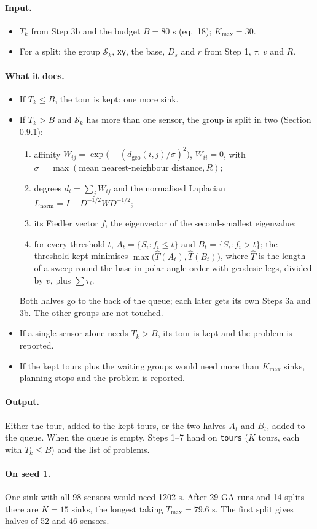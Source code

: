 \documentclass[10pt]{article}
\newcommand{\code}[1]{\texttt{#1}}
\newcommand{\dgeo}{d_{\mathrm{geo}}}
\newcommand{\Kmax}{K_{\max}}
\newcommand{\inputs}{\paragraph{Input.}}
\newcommand{\does}{\paragraph{What it does.}}
\newcommand{\outputs}{\paragraph{Output.}}
\newcommand{\seedone}{\paragraph{On seed 1.}}
\begin{document}
\inputs
\begin{itemize}
  \item $T_k$ from Step 3b and the budget $B = 80$ s (eq.~18); $\Kmax = 30$.
  \item For a split: the group $\mathcal{S}_k$, \code{xy}, the base, $D_s$ and $r$ from Step 1, $\tau$, $v$ and $R$.
\end{itemize}
\does
\begin{itemize}
  \item If $T_k \le B$, the tour is kept: one more sink.
  \item If $T_k > B$ and $\mathcal{S}_k$ has more than one sensor, the group is split in two (Section 0.9.1):
    \begin{enumerate}
      \item affinity $W_{ij} = \exp\!\big(-(\dgeo(i,j)/\sigma)^2\big)$, $W_{ii} = 0$, with
        $\sigma = \max(\text{mean nearest-neighbour distance}, R)$;
      \item degrees $d_i = \sum_j W_{ij}$ and the normalised Laplacian $L_{\mathrm{norm}} = I - D^{-1/2} W D^{-1/2}$;
      \item its Fiedler vector $f$, the eigenvector of the second-smallest eigenvalue;
      \item for every threshold $t$, $A_t = \{S_i : f_i \le t\}$ and $B_t = \{S_i : f_i > t\}$; the threshold kept
        minimises $\max\big(\hat T(A_t), \hat T(B_t)\big)$, where $\hat T$ is the length of a sweep round the base in
        polar-angle order with geodesic legs, divided by $v$, plus $\sum\tau_i$.
    \end{enumerate}
    Both halves go to the back of the queue; each later gets its own Steps 3a and 3b. The other groups are not touched.
  \item If a single sensor alone needs $T_k > B$, its tour is kept and the problem is reported.
  \item If the kept tours plus the waiting groups would need more than $\Kmax$ sinks, planning stops and the problem
    is reported.
\end{itemize}
\outputs Either the tour, added to the kept tours, or the two halves $A_t$ and $B_t$, added to the queue. When the queue
is empty, Steps 1--7 hand on \code{tours} ($K$ tours, each with $T_k \le B$) and the list of problems.
\seedone One sink with all 98 sensors would need 1202 s. After 29 GA runs and 14 splits there are $K = 15$ sinks, the
longest taking $T_{\max} = 79.6$ s. The first split gives halves of 52 and 46 sensors.
\end{document}

